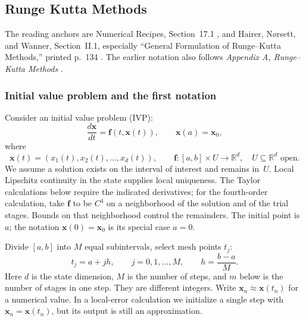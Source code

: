 
\subsection{Runge Kutta Methods}

The reading anchors are Numerical
Recipes, Section~17.1 \cite{nr}, and Hairer, N\o rsett, and Wanner,
Section~II.1, especially ``General Formulation of Runge--Kutta Methods,''
printed p.~134 \cite{HNW1993}. The earlier notation also follows
\emph{Appendix A, Runge--Kutta Methods} \cite{RKAppendix}.

\subsubsection{Initial value problem and the first notation}

Consider an initial value problem (IVP):
\begin{equation}\label{Eq:RKInitialValueProblem}
 \frac{d\mathbf{x}}{dt}=\mathbf{f}(t,\mathbf{x}(t)),
 \qquad \mathbf{x}(a)=\mathbf{x}_0,
\end{equation}
where
\[
 \mathbf{x}(t)=(x_1(t),x_2(t),\dots,x_d(t)),\qquad
 \mathbf{f}:[a,b]\times U\longrightarrow\mathbb{R}^d,
 \quad U\subseteq\mathbb{R}^d\text{ open}.
\]
We assume a solution exists on the interval of interest and remains in~$U$.
Local Lipschitz continuity in the state supplies local uniqueness. The Taylor
calculations below require the indicated derivatives; for the fourth-order
calculation, take $\mathbf f$ to be $C^4$ on a neighborhood of the solution
and of the trial stages. Bounds on that neighborhood control the remainders.
The initial point is~$a$; the notation $\mathbf{x}(0)=\mathbf{x}_0$ is its
special case $a=0$.

Divide $[a,b]$ into $M$ equal subintervals, select mesh points $t_j$:
\begin{equation}\label{Eq:RKMesh}
 t_j=a+jh,\qquad j=0,1,\dots,M,\qquad h=\frac{b-a}{M}.
\end{equation}
Here $d$ is the state dimension, $M$ is the number of steps, and $m$ below
is the number of stages in one step. They are different integers.
Write $\mathbf{x}_n\approx\mathbf{x}(t_n)$ for a numerical value. In a
local-error calculation we initialize a single step with
$\mathbf{x}_n=\mathbf{x}(t_n)$, but its output is still an approximation.

